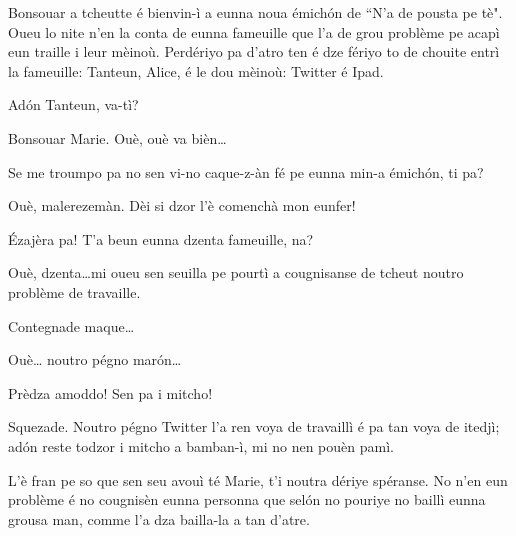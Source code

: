 \begin{drama}

\label{pousta}
 

\Mariespeaks Bonsouar a tcheutte é bienvin-ì a eunna noua émich\'on de ``N’a de pousta pe tè". Oueu lo nite n'en la conta de eunna fameuille que l’a de grou problème pe acapì eun traille i leur mèinoù. Perdériyo pa d'atro ten é dze fériyo to de chouite entrì la fameuille: Tanteun, Alice,  é le dou mèinoù: Twitter é Ipad.


\Mariespeaks Ad\'on Tanteun, va-tì?

\Tanteunspeaks{} Bonsouar Marie. Ouè, ouè va bièn\ldots

\Mariespeaks Se me troumpo pa no sen vi-no caque-z-àn fé pe eunna min-a émich\'on, ti pa?

\Tanteunspeaks{} Ouè,  malerezemàn. Dèi si dzor l’è comenchà mon eunfer!

\Mariespeaks \'Ezajèra pa! T’a beun eunna dzenta fameuille, na?

\Tanteunspeaks Ouè, dzenta\ldots mi oueu sen seuilla pe pourtì a cougnisanse de tcheut noutro problème de travaille.

\Mariespeaks Contegnade maque\ldots

\Tanteunspeaks Ouè\ldots {} noutro pégno mar\'on\ldots


\Alicespeaks Prèdza amoddo! Sen pa i mitcho!

\Tanteunspeaks Squezade. Noutro pégno Twitter l’a ren voya de travaillì é pa tan voya de itedjì; ad\'on reste todzor i mitcho a bamban-ì, mi no nen pouèn pamì.

\Alicespeaks L’è fran pe so que sen seu avouì té Marie, t’i noutra dériye spéranse. No n'en eun problème é no cougnisèn eunna personna que sel\'on no pouriye no baillì eunna grousa man, comme  l’a dza bailla-la a tan d’atre.


\end{drama}
